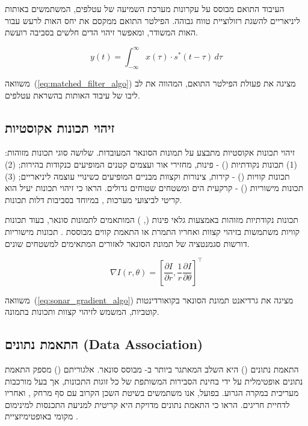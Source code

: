 העיבוד התואם מבוסס על עקרונות מערכת השמיעה של עטלפים, המשתמשים באותות  ליניאריים להשגת רזולוציית טווח גבוהה. הפילטר התואם ממקסם את יחס האות לרעש עבור האות המשודר, ומאפשר זיהוי הדים חלשים בסביבה רועשת.

\begin{equation}
y(t) = \int_{-\infty}^{\infty} x(\tau) \cdot s^*(t - \tau) \, d\tau
\label{eq:matched_filter_algo}
\end{equation}

משוואה~(\ref{eq:matched_filter_algo}) מציגה את פעולת הפילטר התואם, המהווה את לב ליבו של עיבוד האותות בהשראת עטלפים.

\subsection{זיהוי תכונות אקוסטיות}
\label{sec:feature_extraction}

זיהוי תכונות אקוסטיות מתבצע על תמונות הסונאר המעובדות. שלושה סוגי תכונות מזוהות: (1) תכונות נקודתיות () - פינות, מחזירי אור ועצמים קטנים המופיעים כנקודות בהירות; (2) תכונות קוויות () - קירות, צינורות וקצוות מבניים המופיעים כשינויי עוצמה ליניאריים; (3) תכונות מישוריות () - קרקעית הים ומשטחים שטוחים גדולים. \citet{MurArtal2015ORB} הראו כי זיהוי תכונות יעיל הוא קריטי לביצועי מערכות , במיוחד בסביבות דלות תכונות.

תכונות נקודתיות מזוהות באמצעות גלאי פינות (, ) המותאמים לתמונות סונאר, בעוד תכונות קוויות משתמשות בזיהוי קצוות  ואחריו התמרת  או התאמת קווים מבוססת . תכונות מישוריות דורשות סגמנטציה של תמונת הסונאר לאזורים המתאימים למשטחים שונים.

\begin{equation}
\nabla I(r, \theta) = \left[ \frac{\partial I}{\partial r}, \frac{1}{r}\frac{\partial I}{\partial \theta} \right]^\top
\label{eq:sonar_gradient_algo}
\end{equation}

משוואה~(\ref{eq:sonar_gradient_algo}) מציגה את גרדיאנט תמונת הסונאר בקואורדינטות קוטביות, המשמש לזיהוי קצוות ותכונות בתמונה.

\subsection{התאמת נתונים (Data Association)}
\label{sec:data_association}

התאמת נתונים () היא השלב המאתגר ביותר ב- מבוסס סונאר. אלגוריתם  () מספק התאמת נתונים אופטימלית על ידי בחינת הסבירות המשותפת של כל זוגות התכונות, אך בעל מורכבות מעריכית במקרה הגרוע. בפועל, אנו משתמשים בשיטת השכן הקרוב עם סף מרחק , ואחריו  לדחיית חריגים. \citet{Thrun2005ProbRobotics} הראו כי התאמת נתונים מדויקת היא קריטית למניעת התכנסות למינימום מקומי באופטימיזציית .

